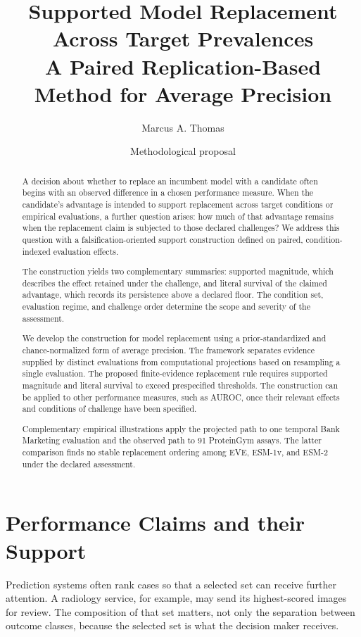 \documentclass[11pt]{article}
\title{Supported Model Replacement Across Target Prevalences\\
\large A Paired Replication-Based Method for Average Precision}
\author{Marcus A. Thomas}
\date{Methodological proposal}
\theoremstyle{remark}
\begin{document}
\maketitle

\begin{abstract}
A decision about whether to replace an incumbent model with a candidate often begins with an observed difference in a chosen performance measure. When the candidate's advantage is intended to support replacement across target conditions or empirical evaluations, a further question arises: how much of that advantage remains when the replacement claim is subjected to those declared challenges? We address this question with a falsification-oriented support construction defined on paired, condition-indexed evaluation effects.

The construction yields two complementary summaries: supported magnitude, which describes the effect retained under the challenge, and literal survival of the claimed advantage, which records its persistence above a declared floor. The condition set, evaluation regime, and challenge order determine the scope and severity of the assessment.

We develop the construction for model replacement using a prior-standardized and chance-normalized form of average precision. The framework separates evidence supplied by distinct evaluations from computational projections based on resampling a single evaluation. The proposed finite-evidence replacement rule requires supported magnitude and literal survival to exceed prespecified thresholds. The construction can be applied to other performance measures, such as AUROC, once their relevant effects and conditions of challenge have been specified.

Complementary empirical illustrations apply the projected path to one temporal
Bank Marketing evaluation and the observed path to 91 ProteinGym assays. The
latter comparison finds no stable replacement ordering among EVE, ESM-1v, and
ESM-2 under the declared assessment.
\end{abstract}


\section{Performance Claims and their Support}
\label{sec:introduction}

Prediction systems often rank cases so that a selected set can receive further
attention. A radiology service, for example, may send its highest-scored images
for review. The composition of that set matters, not only the separation
between outcome classes, because the selected set is what the decision maker
receives.
\end{document}
